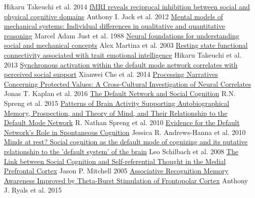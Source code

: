 \documentclass[11pt,a4paper]{article}
\begin{document}
\begin{thebibliography}{9}
       Hikaru Takeuchi et al. 2014
  \href{http://www.sciencedirect.com/science/article/pii/S1053811912010646}{fMRI reveals reciprocal inhibition between social and physical cognitive domains}
  Anthony I. Jack et al. 2012
  \href{http://www.sciencedirect.com/science/article/pii/0010028588900199}{Mental models of mechanical systems: Individual differences in qualitative and quantitative reasoning}
  Marcel Adam Just et al. 1988
  \href{http://www.tandfonline.com/doi/abs/10.1080/02643290342000005}{Neural foundations for understanding social and mechanical concepts}
  Alex Martina et al. 2003
  \href{http://www.sciencedirect.com/science/article/pii/S1053811913006812}{Resting state functional connectivity associated with trait emotional intelligence}
  Hikaru Takeuchi et al. 2013
  \href{http://www.sciencedirect.com/science/article/pii/S0028393214002632}{Synchronous activation within the default mode network correlates with perceived social support}
  Xianwei Che et al. 2014
  \href{http://cercor.oxfordjournals.org/content/early/2016/01/06/cercor.bhv325.abstract}{Processing Narratives Concerning Protected Values: A Cross-Cultural Investigation of Neural Correlates}
  Jonas T. Kaplan et al. 2016
  \href{http://www.sciencedirect.com/science/article/pii/B9780123970251001731}{The Default Network and Social Cognition}
  R.N. Spreng et al. 2015
  \href{http://www.mitpressjournals.org/doi/abs/10.1162/jocn.2009.21282}{Patterns of Brain Activity Supporting Autobiographical Memory, Prospection, and Theory of Mind, and Their Relationship to the Default Mode Network}
  R. Nathan Spreng et al. 2010
  \href{http://jn.physiology.org/content/104/1/322.short}{Evidence for the Default Network's Role in Spontaneous Cognition}
  Jessica R. Andrews-Hanna et al. 2010
  \href{http://www.sciencedirect.com/science/article/pii/S1053810008000378}{Minds at rest? Social cognition as the default mode of cognizing and its putative relationship to the 'default system' of the brain}
  Leo Schilbach et al. 2008
  \href{http://www.mitpressjournals.org/doi/abs/10.1162/0898929055002418}{The Link between Social Cognition and Self-referential Thought in the Medial Prefrontal Cortex}
  Jason P. Mitchell 2005
  \href{http://cercor.oxfordjournals.org/content/early/2015/01/09/cercor.bhu311.short}{Associative Recognition Memory Awareness Improved by Theta-Burst Stimulation of Frontopolar Cortex}
  Anthony J. Ryals et al. 2015

\end{thebibliography}
\end{document}
